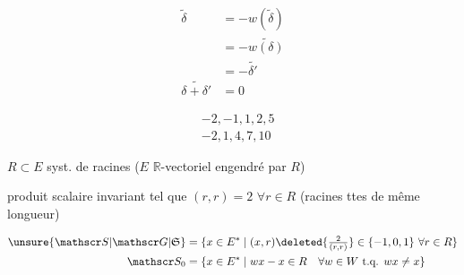 
\[
\begin{aligned}
\widetilde\delta&=-w(\widetilde\delta)\\
&=-\widetilde{w(\delta)}\\
&=-\widetilde{\delta'}\\
\widetilde{\delta+\delta'}&=0
\end{aligned}
\]

\[
\begin{aligned}
&-2,-1,1,2,5\\&-2,1,4,7,10
\end{aligned}
\]


$R\subset E$ syst. de racines ($E$ $\mathbb R$-vectoriel engendré par $R$)

produit scalaire invariant tel que $(r,r)=2$ $\forall r\in R$ (racines ttes de même longueur)

\[
\begin{aligned}
\unsure{\mathscr S|\mathscr G|\mathfrak S}&=\{x\in E^*\mid (x,r)\deleted{\tfrac{2}{(r,r)}}\in\{-1,0,1\}\ \forall r\in R\}\\
\mathscr S_0&=\{x\in E^*\mid wx-x\in R\quad\forall w\in W\ \text{t.q. }wx\ne x\}
\end{aligned}
\]

